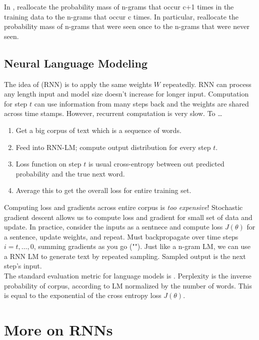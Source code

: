 \documentclass{article}
\begin{document}
In , reallocate the probability mass of n-grams that occur c+1 times in the training data to the n-grams that occur c times. In particular, reallocate the probability mass of n-grams that were seen once to the n-grams that were never seen.  

\subsection{Neural Language Modeling}

The idea of  (RNN) is to apply the same weights $W$ repeatedly. RNN can process any length input and model size doesn't increase for longer input. Computation for step $t$ can use information from many steps back and the weights are shared across time stamps. However, recurrent computation is very slow. To \dots 
\begin{enumerate}
  \item Get a big corpus of text which is a sequence of words.
  \item Feed into RNN-LM; compute output distribution for every step $t$.
  \item Loss function on step $t$ is usual cross-entropy between out predicted probability and the true next word.
  \item Average this to get the overall loss for entire training set. 
\end{enumerate}
Computing loss and gradients across entire corpus is \emph{too expensive}! Stochastic gradient descent allows us to compute loss and gradient for small set of data and update. In practice, consider the inputs as a sentnece and compute loss $J(\theta)$ for a sentence, update weights, and repeat. Must backpropagate over time steps $i=t, \dots , 0$, summing gradients as you go (""). Just like a n-gram LM, we can use a RNN LM to generate text by repeated sampling. Sampled output is the next step's input. \\ 

The standard evaluation metric for language models is . Perplexity is the inverse probability of corpus, according to LM normalized by the number of words. This is equal to the exponential of the cross entropy loss $J(\theta)$. 

\section{More on RNNs}
\end{document}
